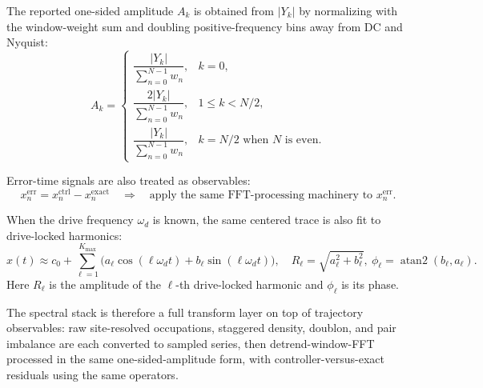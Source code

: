 \documentclass[11pt]{article}
\begin{document}
The reported one-sided amplitude $A_k$ is obtained from $|Y_k|$ by normalizing with the window-weight sum and doubling positive-frequency bins away from DC and Nyquist:
\[
A_k=
\begin{cases}
\dfrac{|Y_k|}{\sum_{n=0}^{N-1} w_n}, & k=0,\\
\dfrac{2|Y_k|}{\sum_{n=0}^{N-1} w_n}, & 1\le k< N/2,\\
\dfrac{|Y_k|}{\sum_{n=0}^{N-1} w_n}, & k=N/2 \text{ when } N \text{ is even}.
\end{cases}
\]

Error-time signals are also treated as observables:
\[
x^{\mathrm{err}}_n=x^{\mathrm{ctrl}}_n-x^{\mathrm{exact}}_n
\quad\Rightarrow\quad
\text{apply the same FFT-processing machinery to }x^{\mathrm{err}}_n.
\]

When the drive frequency $\omega_d$ is known, the same centered trace is also fit to drive-locked harmonics:
\[
x(t)\approx c_0+\sum_{\ell=1}^{K_{\max}}\!\bigl(a_\ell\cos(\ell\omega_d t)+b_\ell\sin(\ell\omega_d t)\bigr),
\quad
R_\ell=\sqrt{a_\ell^2+b_\ell^2},\ \phi_\ell=\operatorname{atan2}(b_\ell,a_\ell).
\]
Here $R_\ell$ is the amplitude of the $\ell$-th drive-locked harmonic and $\phi_\ell$ is its phase.

The spectral stack is therefore a full transform layer on top of trajectory observables: raw site-resolved occupations, staggered density, doublon, and pair imbalance are each converted to sampled series, then detrend-window-FFT processed in the same one-sided-amplitude form, with controller-versus-exact residuals using the same operators.
\end{document}
